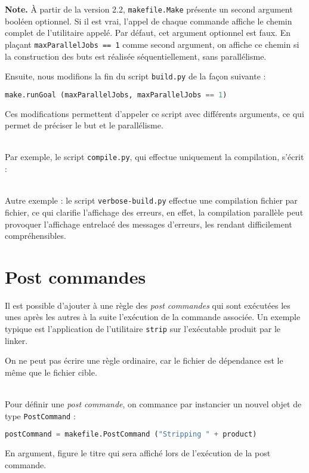 \documentclass[a4paper,11pt]{extarticle}
\begin{document}
{\bf Note.}\label{logUtilityToolPath2} À partir de la version 2.2, \texttt{makefile.Make} présente un second argument booléen optionnel.  Si il est vrai, l'appel de chaque commande affiche le chemin complet de l'utilitaire appelé. Par défaut, cet argument optionnel est faux. En plaçant \texttt{maxParallelJobs == 1} comme second argument, on affiche ce chemin si la construction des buts est réalisée séquentiellement, sans parallélisme.

Ensuite, nous modifions la fin du script \texttt{build.py} de la façon suivante :
\begin{lstlisting}[language=py]
make.runGoal (maxParallelJobs, maxParallelJobs == 1)
\end{lstlisting}

Ces modifications permettent d'appeler ce script avec différents arguments, ce qui permet de préciser le but et le parallélisme.

~\\Par exemple, le script \texttt{compile.py}, qui effectue uniquement la compilation, s'écrit :



~\\Autre exemple : le script \texttt{verbose-build.py} effectue une compilation fichier par fichier, ce qui clarifie l'affichage des erreurs, en effet, la compilation parallèle peut provoquer l'affichage entrelacé des messages d'erreurs, les rendant difficilement compréhensibles.








\section{Post commandes}

Il est possible d'ajouter à une règle des \emph{post commandes} qui sont exécutées les unes après les autres à la suite l'exécution de la commande associée. Un exemple typique est l'application de l'utilitaire \texttt{strip} sur l'exécutable produit par le linker.

On ne peut pas écrire une règle ordinaire, car le fichier de dépendance est le même que le fichier cible.

~\\Pour définir une \emph{post commande}, on commance par instancier un nouvel objet de type \texttt{PostCommand} :
\begin{lstlisting}[language=py]
postCommand = makefile.PostCommand ("Stripping " + product)
\end{lstlisting}
En argument, figure le titre qui sera affiché lors de l'exécution de la post commande.
\end{document}
